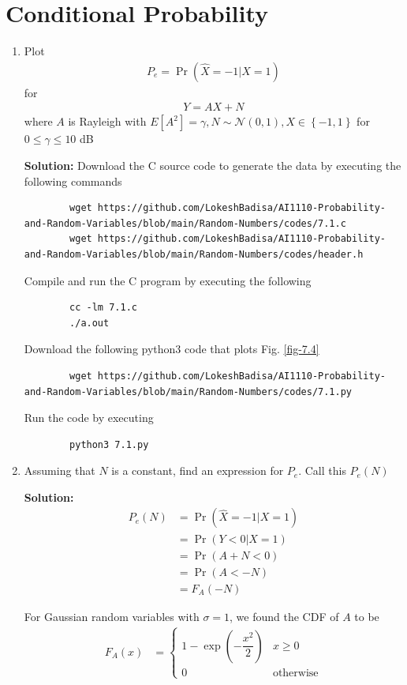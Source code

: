 \documentclass[journal,12pt,twocolumn]{IEEEtran}
\newcommand{\solution}{\noindent \textbf{Solution: }}
\providecommand{\pr}[1]{\ensuremath{\Pr\left(#1\right)}}
\providecommand{\brak}[1]{\ensuremath{\left(#1\right)}}
\providecommand{\cbrak}[1]{\ensuremath{\left\{#1\right\}}}
\providecommand{\sbrak}[1]{\ensuremath{\left[#1\right]}}
\providecommand{\gauss}[2]{\mathcal{N}\ensuremath{\left(#1,#2\right)}}
\numberwithin{equation}{section}
\renewcommand\thesection{\arabic{section}}
\begin{document}
	\section{Conditional Probability}
	\begin{enumerate}[label=\thesection.\arabic*,ref=\thesection.\theenumi]
	\item Plot 
	\begin{align}
		P_e = \pr{\hat{X} = -1|X=1}	
	\end{align}
	for 
	\begin{align}
		Y = AX+N
	\end{align}
	where $A$ is Rayleigh with $E\sbrak{A^2} = \gamma, N \sim \gauss{0}{1}, X \in \cbrak{-1,1}$ for $0 \le \gamma \le 10$ dB
	
	\solution Download the C source code to generate the data by executing the following commands
	\begin{lstlisting}
		wget https://github.com/LokeshBadisa/AI1110-Probability-and-Random-Variables/blob/main/Random-Numbers/codes/7.1.c
		wget https://github.com/LokeshBadisa/AI1110-Probability-and-Random-Variables/blob/main/Random-Numbers/codes/header.h
	\end{lstlisting}
	Compile and run the C program by executing the following
	\begin{lstlisting}
		cc -lm 7.1.c
		./a.out
	\end{lstlisting}
	
	Download the following python3 code that plots Fig. \ref{fig-7.4} 
	\begin{lstlisting}
		wget https://github.com/LokeshBadisa/AI1110-Probability-and-Random-Variables/blob/main/Random-Numbers/codes/7.1.py
	\end{lstlisting}
	Run the code by executing
	\begin{lstlisting}
		python3 7.1.py
	\end{lstlisting}
	
	\item Assuming that $N$ is a constant, find an expression for $P_e$.  Call this $P_e(N)$
	
	\solution 
	\begin{align}
		P_e(N) &= \pr{\hat{X} = -1|X = 1} \\
		&= \pr{Y<0|X=1} \\
		&= \pr{A+N<0} \\
		&= \pr{A<-N} \\
		&= F_A(-N)
	\end{align}
	
	For Gaussian random variables with $\sigma = 1$, we found the CDF of $A$ to be
	\begin{align}
		F_A(x) &= 
		\begin{cases}
			1 - \exp\brak{-\dfrac{x^2}{2}} & x \geq 0 \\
			0 & \text{otherwise}
		\end{cases}
	\end{align}
	

\end{enumerate}
\end{document}

